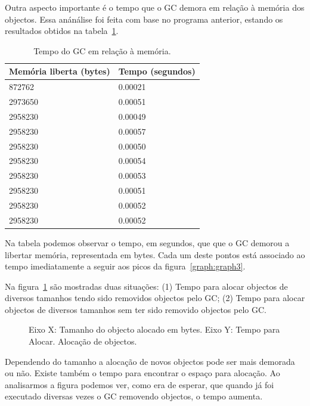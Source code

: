 \documentclass{article}
\begin{document}
Outra aspecto importante é o tempo que o GC demora em relação à memória dos objectos. Essa anánálise foi feita com base no programa anterior, estando os resultados obtidos na tabela~\ref{tab:tabela1}.

\begin{table}[h!]
  \begin{center}
    \begin{tabular}{l | l}
    Memória liberta (bytes) & Tempo (segundos) \\
    \hline
    872762 & 0.00021 \\
    2973650 & 0.00051 \\
    2958230 & 0.00049 \\
    2958230 & 0.00057 \\
    2958230 & 0.00050 \\
    2958230 & 0.00054 \\
    2958230 & 0.00053 \\
    2958230 & 0.00051 \\
    2958230 & 0.00052 \\
    2958230 & 0.00052 \\
    \hline
    \end{tabular}
  \end{center}
  \caption{Tempo do GC em relação à memória.}
  \label{tab:tabela1}
\end{table}

Na tabela podemos observar o tempo, em segundos, que que o GC  demorou a libertar memória, representada em bytes. Cada um deste pontos está associado ao tempo imediatamente a seguir aos picos da figura~\ref{graph:graph3}.

Na figura~\ref{graph:graph4} são mostradas duas situações: (1) Tempo para alocar objectos de diversos tamanhos tendo sido removidos objectos pelo GC; (2) Tempo para alocar objectos de diversos tamanhos sem ter sido removido objectos pelo GC.

\begin{figure}[h!]
  \begin{center}
    
    \caption{Eixo X: Tamanho do objecto alocado em bytes. Eixo Y: Tempo para Alocar. Alocação de objectos.}
    \label{graph:graph4}
  \end{center}
\end{figure}

Dependendo do tamanho a alocação de novos objectos pode ser mais demorada ou não. Existe também o tempo para encontrar o espaço para alocação. Ao analisarmos a figura podemos ver, como era de esperar, que quando já foi executado diversas vezes o GC removendo objectos, o tempo aumenta.
\end{document}
